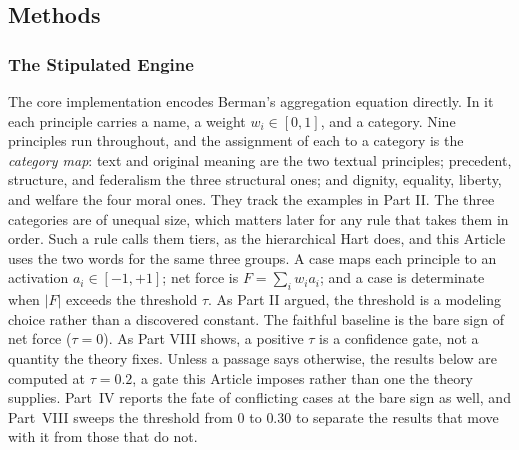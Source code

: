 \subsection{Methods}

\subsubsection{The Stipulated Engine}

The core implementation encodes Berman's aggregation equation directly. In it
each principle carries a name, a weight $w_i \in [0,1]$, and a category. Nine principles run throughout, and the assignment of each to
a category is the \textit{category map}: text and original meaning are the two textual principles; precedent,
structure, and federalism the three structural ones; and dignity, equality,
liberty, and welfare the four moral ones. They
track the examples in Part II. The three categories are of unequal size, which matters later for any rule
that takes them in order. Such a rule calls them tiers, as the hierarchical
Hart does, and this Article uses the two words for the same three groups. A case maps each principle to an activation
$a_i \in [-1,+1]$; net force is $F = \sum_i w_i a_i$; and a case is
determinate when $|F|$ exceeds the threshold $\tau$. As Part II argued, the threshold is a modeling choice rather than a
discovered constant. The faithful baseline is the bare sign of net force
($\tau = 0$). As Part VIII shows, a positive $\tau$ is a confidence gate, not a quantity
the theory fixes. Unless a passage says otherwise, the results below are computed at $\tau =
0.2$, a gate this Article imposes rather than one the theory supplies. Part~IV
reports the fate of conflicting cases at the bare sign as well, and
Part~VIII sweeps the threshold from $0$ to $0.30$ to separate the results that
move with it from those that do not.

